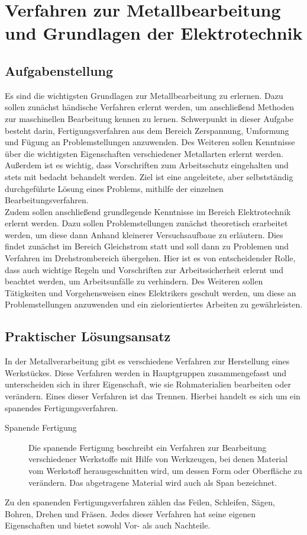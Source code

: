 \chapter{Verfahren zur Metallbearbeitung und Grundlagen der Elektrotechnik}
\label{cha:Metallbearbeitung und Elektrotechnik}

\section{Aufgabenstellung}

Es sind die wichtigsten Grundlagen zur Metallbearbeitung zu erlernen. Dazu sollen zunächst händische Verfahren erlernt werden, um anschließend Methoden zur
 maschinellen Bearbeitung kennen zu lernen. Schwerpunkt in dieser Aufgabe besteht darin, Fertigungsverfahren aus dem Bereich Zerspannung, Umformung und Fügung 
 an Problemstellungen anzuwenden. Des Weiteren sollen Kenntnisse über die wichtigsten Eigenschaften verschiedener Metallarten erlernt werden. Außerdem ist es 
 wichtig, dass Vorschriften zum Arbeitsschutz eingehalten und stets mit bedacht behandelt werden. Ziel ist eine angeleitete, aber selbstständig durchgeführte 
 Lösung eines Problems, mithilfe der einzelnen Bearbeitungsverfahren. \\
Zudem sollen anschließend grundlegende Kenntnisse im Bereich Elektrotechnik erlernt werden. Dazu sollen Problemstellungen zunächst theoretisch erarbeitet 
werden, um diese dann Anhand kleinerer Versuchsaufbaue zu erläutern. Dies findet zunächst im Bereich Gleichstrom statt und soll dann zu Problemen und 
Verfahren im Drehstrombereich übergehen. Hier ist es von entscheidender Rolle, dass auch wichtige Regeln und Vorschriften zur Arbeitssicherheit erlernt und 
beachtet werden, um Arbeitsunfälle zu verhindern. Des Weiteren sollen Tätigkeiten und Vorgehensweisen eines Elektrikers geschult werden, um diese an 
Problemstellungen anzuwenden und ein zielorientiertes Arbeiten zu gewährleisten. 

\section{Praktischer Lösungsansatz}

In der Metallverarbeitung gibt es verschiedene Verfahren zur Herstellung eines Werkstückes. Diese Verfahren werden in Hauptgruppen zusammengefasst und 
unterscheiden sich in ihrer Eigenschaft, wie sie Rohmaterialien bearbeiten oder verändern. Eines dieser Verfahren ist das Trennen. Hierbei handelt es sich 
um ein spanendes Fertigungsverfahren.
\begin{description}
\item[Spanende Fertigung] Die spanende Fertigung beschreibt ein Verfahren zur Bearbeitung verschiedener Werkstoffe mit Hilfe von Werkzeugen, bei denen 
Material vom Werkstoff herausgeschnitten wird, um dessen Form oder Oberfläche zu verändern. Das abgetragene Material wird auch als Span bezeichnet. %
\end{description}
Zu den spanenden Fertigungsverfahren zählen \zB das Feilen, Schleifen, Sägen, Bohren, Drehen und Fräsen. Jedes dieser Verfahren hat seine eigenen 
Eigenschaften und bietet sowohl Vor- als auch Nachteile. 
